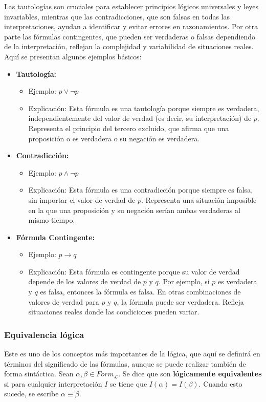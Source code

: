 Las tautologías son cruciales para establecer principios lógicos universales y leyes invariables, mientras que las contradicciones, que son falsas en todas las interpretaciones, ayudan a identificar y evitar errores en razonamientos. Por otra parte las fórmulas contingentes, que pueden ser verdaderas o falsas dependiendo de la interpretación, reflejan la complejidad y variabilidad de situaciones reales. Aquí se presentan algunos ejemplos básicos:

\begin{itemize}
  \item \textbf{Tautología:}
    \begin{itemize}
      \item Ejemplo: $ p \vee \neg p $
      \item Explicación: Esta fórmula es una tautología porque siempre es verdadera, independientemente del valor de verdad (es decir, su interpretación) de $ p $. Representa el principio del tercero excluido, que afirma que una proposición o es verdadera o su negación es verdadera.
    \end{itemize}

  \item \textbf{Contradicción:}
    \begin{itemize}
      \item Ejemplo: $ p \wedge \neg p $
      \item Explicación: Esta fórmula es una contradicción porque siempre es falsa, sin importar el valor de verdad de $ p $. Representa una situación imposible en la que una proposición y su negación serían ambas verdaderas al mismo tiempo.
    \end{itemize}

  \item \textbf{Fórmula Contingente:}
    \begin{itemize}
      \item Ejemplo: $ p \rightarrow q $
      \item Explicación: Esta fórmula es contingente porque su valor de verdad depende de los valores de verdad de $ p $ y $ q $. Por ejemplo, si $ p $ es verdadera y $ q $ es falsa, entonces la fórmula es falsa. En otras combinaciones de valores de verdad para $ p $ y $ q $, la fórmula puede ser verdadera. Refleja situaciones reales donde las condiciones pueden variar.
    \end{itemize}
\end{itemize}

\subsubsection{Equivalencia lógica}\label{subsubsection:lpropequivalency}
Este es uno de los conceptos más importantes de la lógica, que aquí se definirá en términos del significado de las fórmulas, aunque se puede realizar también de forma sintáctica. Sean $\alpha,\beta \in Form_{\mathcal{L}}$. Se dice que son \textbf{lógicamente equivalentes} si para cualquier interpretación $I$ se tiene que $I(\alpha) = I(\beta)$. Cuando esto sucede, se escribe $\alpha \equiv \beta$.

